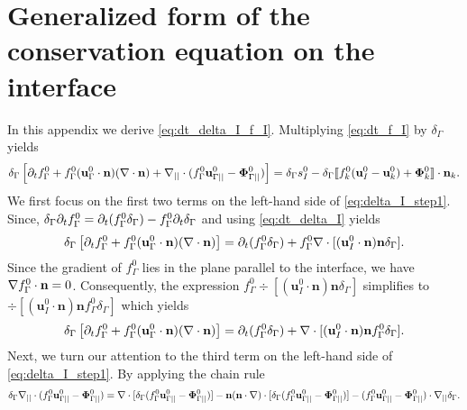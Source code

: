 \documentclass[11pt]{My_preprint}
\begin{document}
\section{Generalized form of the conservation equation on the interface}
\label{ap:interface_proof}
In this appendix we derive \ref{eq:dt_delta_I_f_I}. Multiplying \ref{eq:dt_f_I} by $\delta_\Gamma$ yields
\begin{equation}
    \delta_\Gamma
    \left[ \pddt f_\Gamma^0 
    + f_\Gamma^0 (\textbf{u}_\Gamma^0\cdot \textbf{n})  (\div \textbf{n})
    +\divI
    (f_\Gamma^0 \textbf{u}_{\Gamma||}^0
    - \mathbf{\Phi}_{\Gamma||}^0 )
    \right]
    = \delta_\Gamma s_I^0
    - \delta_\Gamma\Jump{
    f_k^0 (\textbf{u}_I^0 - \textbf{u}_k^0)
    + \mathbf{\Phi}_k^0}.
    \label{eq:delta_I_step1}
\end{equation}
We first focus on the first two terms on the left-hand side of \ref{eq:delta_I_step1}. Since, $\delta_\Gamma\partial_t f_\Gamma^0 = \partial_t (f_\Gamma^0\delta_\Gamma) - f_\Gamma^0\partial_t\delta_\Gamma$ and using \ref{eq:dt_delta_I} yields
\begin{equation}
\delta_\Gamma
    \left[ \partial_t f_\Gamma^0 
    + f_\Gamma^0 (\textbf{u}_\Gamma^0\cdot \textbf{n})  (\mathbf{\nabla}\cdot \textbf{n}) \right] = \partial_t (f_\Gamma^0\delta_\Gamma) + f_\Gamma^0\mathbf{\nabla}\cdot [(\textbf{u}_I^0\cdot \textbf{n}) \textbf{n}\delta_\Gamma ].
\end{equation}
Since the gradient of $f_\Gamma^0$ lies in the plane parallel to the interface, we have  $\mathbf{\nabla} f_\Gamma^0 \cdot \textbf{n} = 0$. Consequently, the expression $f_\Gamma^0\div [(\textbf{u}_I^0\cdot \textbf{n}) \textbf{n}\delta_\Gamma ]$ simplifies to $\div [(\textbf{u}_I^0\cdot \textbf{n}) \textbf{n}f_\Gamma^0\delta_\Gamma ]$ which yields 
\begin{equation}
\delta_\Gamma
    \left[ \pddt f_\Gamma^0 
    + f_\Gamma^0 (\textbf{u}_\Gamma^0\cdot \textbf{n})  (\div \textbf{n}) \right] = \pddt (f_\Gamma^0\delta_\Gamma) + \div [(\textbf{u}_I^0\cdot \textbf{n}) \textbf{n}f_\Gamma^0\delta_\Gamma ].
\label{eq:delta_I_step1_2}
\end{equation}
Next, we turn our attention to the third term on the left-hand side of \ref{eq:delta_I_step1}. By applying the chain rule
\begin{equation}
    \delta_\Gamma \divI (f_\Gamma^0 \textbf{u}_{\Gamma||}^0
    - \mathbf{\Phi}_{\Gamma||}^0 ) = 
    \div [\delta_\Gamma (f_\Gamma^0 \textbf{u}_{\Gamma||}^0
    - \mathbf{\Phi}_{\Gamma||}^0 )]
    - \textbf{n}(\textbf{n}\cdot\grad)\cdot [\delta_\Gamma (f_\Gamma^0 \textbf{u}_{\Gamma||}^0
    - \mathbf{\Phi}_{\Gamma||}^0 )]
    - (f_\Gamma^0 \textbf{u}_{\Gamma||}^0
    - \mathbf{\Phi}_{\Gamma||}^0 )\cdot\gradI\delta_\Gamma.
\label{eq:delta_I_step2}
\end{equation}
\end{document}
